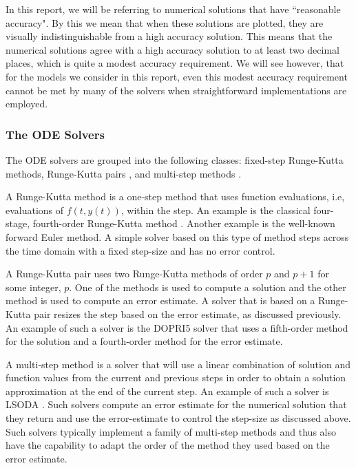 In this report, we will be referring to numerical solutions that have ``reasonable accuracy". By this we mean 
that when these solutions are plotted, they are visually indistinguishable from a high accuracy solution. This means that the numerical solutions agree with a high accuracy solution to at least two decimal places, which is quite a modest accuracy 
requirement. We will see however, that for the models we consider in this report, even this modest accuracy requirement cannot be met by many of the solvers when straightforward implementations are employed.

\subsubsection{The ODE Solvers}
\label{subsection:numerical_software_used}
The ODE solvers are grouped into the following classes: fixed-step Runge-Kutta methods, Runge-Kutta pairs \cite{MR3822086}, and multi-step methods \cite{MR3822086}.

A Runge-Kutta method is a one-step method that uses function evaluations, i.e, evaluations of $f(t, y(t))$, within the step. An example is the classical four-stage, fourth-order Runge-Kutta method \cite{MR3822086}. Another example is the well-known forward Euler method. A simple solver based on this type of method steps across the time domain with a fixed step-size and has no error control.

A Runge-Kutta pair \cite{MR3822086} uses two Runge-Kutta methods of order $p$ and $p+1$ for some integer, $p$. One of the methods is used to compute a solution and the other method is used to compute an error estimate. A solver that is based on a Runge-Kutta pair resizes the step based on the error estimate, as discussed previously. An example of such a solver is the DOPRI5 solver \cite{MR3822086} that uses a fifth-order method for the solution and a fourth-order method for the error estimate.

A multi-step method is a solver that will use a linear combination of solution and function values from the current and previous steps in order to obtain a solution approximation at the end of the current step. An example of such a solver is LSODA \cite{MR3822086}. Such solvers compute an error estimate for the numerical solution that they return and use the error-estimate to control the step-size as discussed above. Such solvers typically implement a family of multi-step methods and thus also have the capability to adapt the order of the method they used based on the error estimate.

